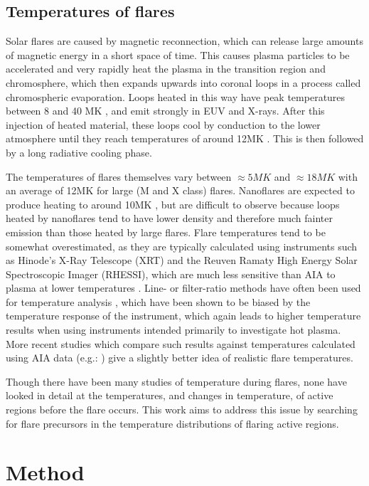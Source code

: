 \documentclass{article}
\begin{document}
\subsection{Temperatures of flares}
Solar flares are caused by magnetic reconnection, which can release
large amounts of magnetic energy in a short space of time. This causes
plasma particles to be accelerated and very rapidly heat the plasma
in the transition region and chromosphere, which then expands upwards
into coronal loops \citep{Simoes2015} in a process called chromospheric
evaporation. Loops heated in this way have peak temperatures between
8 and 40 MK \citep{Ryan2013,Ryan2014}, and emit strongly in EUV and
X-rays. After this injection of heated material, these loops cool
by conduction to the lower atmosphere until they reach temperatures
of around 12MK \citep{Aschwanden2005}. This is then followed by a
long radiative cooling phase.

The temperatures of flares themselves vary between $\approx5MK$ and
$\approx18MK$ with an average of 12MK for large (M and X class) flares.
Nanoflares are expected to produce heating to around 10MK \citep{Reale2011a},
but are difficult to observe because loops heated by nanoflares tend
to have lower density and therefore much fainter emission than those
heated by large flares. Flare temperatures tend to be somewhat overestimated,
as they are typically calculated using instruments such as Hinode's
X-Ray Telescope (XRT) and the
Reuven Ramaty High Energy Solar Spectroscopic Imager (RHESSI),
which are much less sensitive than AIA to plasma at lower temperatures
. Line- or filter-ratio methods have often been used for temperature
analysis , which have been shown to be biased by the temperature
response of the instrument, which again leads to higher temperature
results when using instruments intended primarily to investigate hot
plasma. More recent studies which compare such results against temperatures
calculated using AIA data (e.g.: \citet{Ryan2013,Ryan2014}) give
a slightly better idea of realistic flare temperatures.

Though there have been many studies of temperature during flares,
none have looked in detail at the temperatures, and changes in temperature,
of active regions before the flare occurs. This work aims to address
this issue by searching for flare precursors in the temperature distributions
of flaring active regions.


\section{Method}
\end{document}
